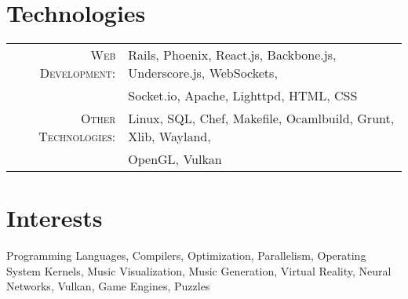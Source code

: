 \documentclass[a4paper,10pt]{article}
\begin{document}
\section{Technologies}
\begin{tabular}{rl}
  \textsc{Web Development:}    & Rails, Phoenix, React.js, Backbone.js, Underscore.js, WebSockets,\\
                               & Socket.io, Apache, Lighttpd, HTML, CSS\\
  \textsc{Other Technologies:} & Linux, SQL, Chef, Makefile, Ocamlbuild, Grunt, Xlib, Wayland,\\
                               & OpenGL, Vulkan\\
\end{tabular}


\section{Interests}
\begin{addmargin}[3em]{1em}
Programming Languages, Compilers, Optimization, Parallelism, Operating System Kernels, Music Visualization, Music Generation, Virtual Reality, Neural Networks, Vulkan, Game Engines, Puzzles\\
\end{addmargin}


\end{document}
